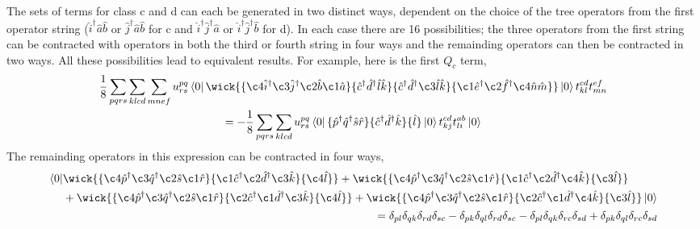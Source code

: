 The sets of terms for class c and d can each be generated in two distinct
ways, dependent on the choice of the tree operators from the first operator
string ($\hat{i}^\dagger \hat{a} \hat{b}$ or 
$\hat{j}^\dagger \hat{a} \hat{b}$ for c and 
$\hat{i}^\dagger \hat{j}^\dagger \hat{a}$ or 
$\hat{i}^\dagger \hat{j}^\dagger \hat{b}$ for d). In each case there 
are 16 possibilities; the three operators from the first string can be 
contracted with operators in both the third or fourth string in four ways and
the remainding operators can then be contracted in two ways. All these
possibilities lead to equivalent results. For example, here is the first 
$Q_c$ term,
\begin{equation}
    \begin{gathered}
    \frac{1}{8} \sum_{pqrs} \sum_{klcd} \sum_{mnef}
    u^{pq}_{rs} \bra{0}
        \wick{
        \{\c4{\hat{i}}^\dagger \c3{\hat{j}}^\dagger \c2{\hat{b}} \c1{\hat{a}} \}
        \{\hat{c}^\dagger \hat{d}^\dagger \hat{l} \hat{k} \} 
        \{\hat{c}^\dagger \hat{d}^\dagger \c3{\hat{l}} \hat{k} \}
        \{\c1{\hat{e}}^\dagger \c2{\hat{f}}^\dagger \c4{\hat{n}} \hat{m} \}
        }
    \ket{0} t^{cd}_{kl} t^{ef}_{mn} \\
    = - \frac{1}{8} \sum_{pqrs} \sum_{klcd}
    u^{pq}_{rs} \bra{0} 
        \{\hat{p}^\dagger \hat{q}^\dagger \hat{s} \hat{r} \}
        \{\hat{c}^\dagger \hat{d}^\dagger \hat{k} \}
        \{\hat{l} \}
    \ket{0} t^{cd}_{kj} t^{ab}_{li}
    \ket{0}
    \end{gathered}
\end{equation}
The remainding operators in this expression can be contracted in four ways,
\begin{align}
    \begin{aligned}
        \bra{0}&
        \wick{
        \{\c4{\hat{p}}^\dagger \c3{\hat{q}}^\dagger \c2{\hat{s}} \c1{\hat{r}}\}
        \{\c1{\hat{c}}^\dagger \c2{\hat{d}}^\dagger \c3{\hat{k}} \}
        \{\c4{\hat{l}} \}
        }
        +
        \wick{
        \{\c4{\hat{p}}^\dagger \c3{\hat{q}}^\dagger \c2{\hat{s}} \c1{\hat{r}}\}
        \{\c1{\hat{c}}^\dagger \c2{\hat{d}}^\dagger \c4{\hat{k}} \}
        \{\c3{\hat{l}} \}
        } \\
        &+
        \wick{
        \{\c4{\hat{p}}^\dagger \c3{\hat{q}}^\dagger \c2{\hat{s}} \c1{\hat{r}}\}
        \{\c2{\hat{c}}^\dagger \c1{\hat{d}}^\dagger \c3{\hat{k}} \}
        \{\c4{\hat{l}} \}
        }
        +
        \wick{
        \{\c4{\hat{p}}^\dagger \c3{\hat{q}}^\dagger \c2{\hat{s}} \c1{\hat{r}}\}
        \{\c2{\hat{c}}^\dagger \c1{\hat{d}}^\dagger \c4{\hat{k}} \}
        \{\c3{\hat{l}} \}
        } \ket{0}
    \end{aligned} \\
    = \delta_{pl} \delta_{qk} \delta_{rd} \delta_{sc}
    - \delta_{pk} \delta_{ql} \delta_{rd} \delta_{sc}
    - \delta_{pl} \delta_{qk} \delta_{rc} \delta_{sd}
    + \delta_{pk} \delta_{ql} \delta_{rc} \delta_{sd}
\end{align}
